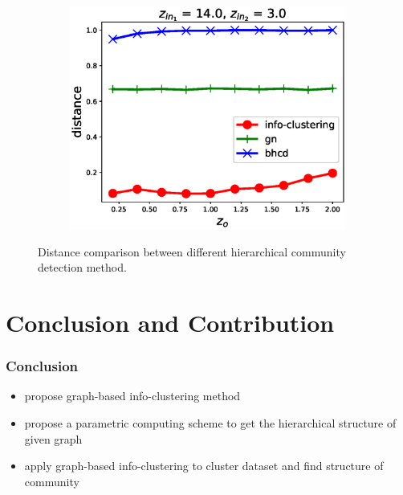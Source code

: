 \documentclass[notheorems]{beamer}
\begin{document}
\begin{frame}
\begin{figure}
\begin{subfigure}{0.33\textwidth}
		\caption{}
	\end{subfigure}~
	\begin{subfigure}{0.33\textwidth}
		\includegraphics[width=\textwidth]{paper/pic/z_o.eps}
		\caption{}
	\end{subfigure}
	\caption{{\scriptsize Distance comparison between different hierarchical community detection method.}}\label{fig:cdr}	
\end{figure}    
\end{frame}
\section{Conclusion and Contribution}
\begin{frame}
\frametitle{Conclusion}
\begin{itemize}
\item propose graph-based info-clustering method
\item propose a parametric computing scheme to get the hierarchical structure of given graph 
\item apply graph-based info-clustering to cluster dataset and find structure of community
\end{itemize}
\end{frame}
\end{document}
